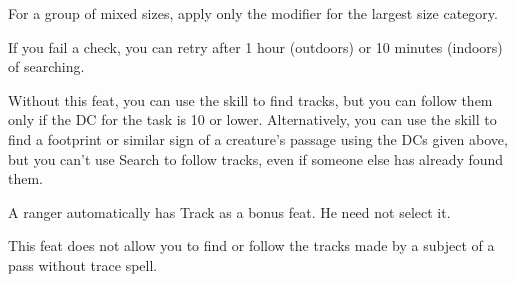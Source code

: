 {

For a group of mixed sizes, apply only the modifier for the largest size category.

If you fail a  check, you can retry after 1 hour (outdoors) or 10 minutes (indoors) of searching.}
{Without this feat, you can use the  skill to find tracks, but you can follow them only if the DC for the task is 10 or lower. Alternatively, you can use the  skill to find a footprint or similar sign of a creature's passage using the DCs given above, but you can't use Search to follow tracks, even if someone else has already found them.}
{A ranger automatically has Track as a bonus feat. He need not select it.

This feat does not allow you to find or follow the tracks made by a subject of a pass without trace spell.}

